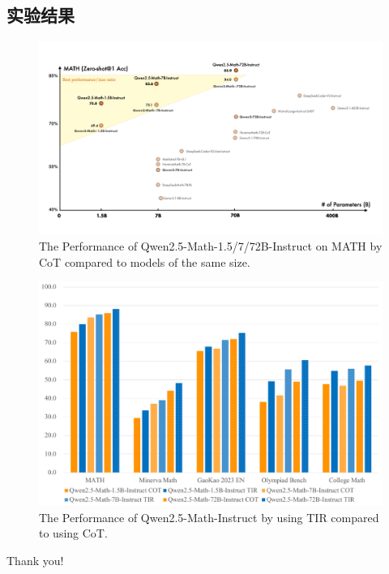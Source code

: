 \documentclass[aspectratio=169]{beamer}
\begin{document}
\subsection{实验结果}
\begin{frame}
	\begin{figure}[htbp]
		\centering
		\includegraphics[width=0.8\columnwidth]{pic/all_size.png}
		\vspace{-1mm}
		\caption{The Performance of Qwen2.5-Math-1.5/7/72B-Instruct on MATH by CoT compared to models of the same size.}
		\label{fig:exp}
	\end{figure}
\end{frame}

\begin{frame}
	\begin{figure}[htbp]
		\centering
		\includegraphics[width=0.7\columnwidth]{pic/COT_vs_TIR.pdf}
		\caption{The Performance of Qwen2.5-Math-Instruct by using TIR compared to using CoT.}
		\label{fig:exp_tir}
	\end{figure}
\end{frame}






\begin{frame}
	\begin{center}
		{\Huge Thank you!}
	\end{center}
\end{frame}
\end{document}
